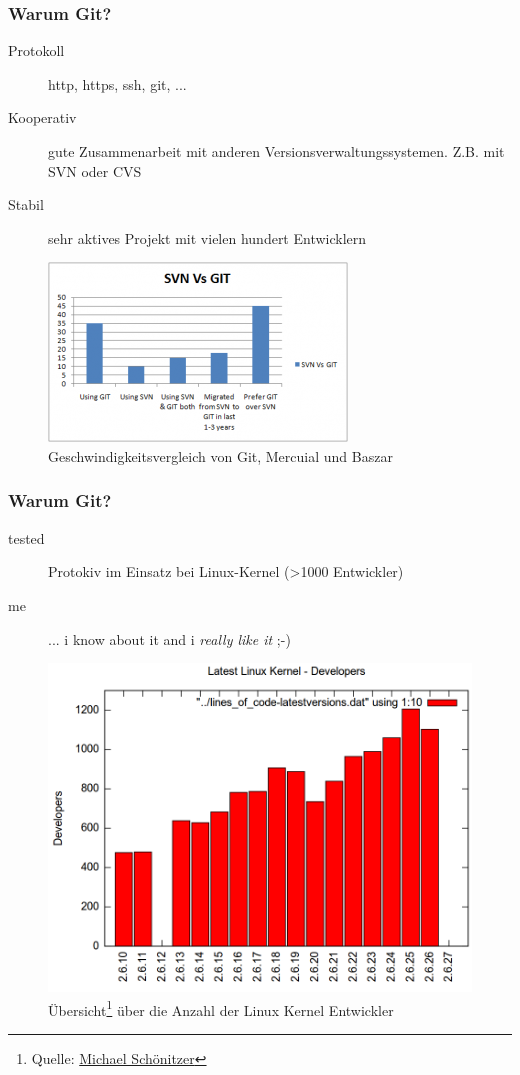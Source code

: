 \documentclass{beamer}
\begin{document}
\begin{frame}\frametitle{Warum Git?}
\begin{description}
\item[Protokoll] http, https, ssh, git, ...
\item[Kooperativ] gute Zusammenarbeit mit anderen Versionsverwaltungssystemen. Z.B. mit SVN oder CVS
\item[Stabil] sehr aktives Projekt mit vielen hundert Entwicklern
\end{description}

\begin{figure}
\includegraphics[scale=0.5]{Bilder/svnvsgit1} 
\caption{Geschwindigkeitsvergleich von Git, Mercuial und Baszar}
\end{figure}
\end{frame}

\begin{frame}\frametitle{Warum Git?}
\begin{description}
\item[tested] Protokiv im Einsatz bei Linux-Kernel (>1000 Entwickler)
\item[me] ... i know about it and i \textit{really like it} ;-)
\end{description}

\begin{figure}
\includegraphics[scale=0.2]{Bilder/kernel_Entwickler} 
\caption{Übersicht\footnote{Quelle: \href{http://www.schoenitzer.de/lks/lks.html\#new_developers}{Michael Schönitzer}} über die Anzahl der Linux Kernel Entwickler}
\end{figure}
\end{frame}
\end{document}
